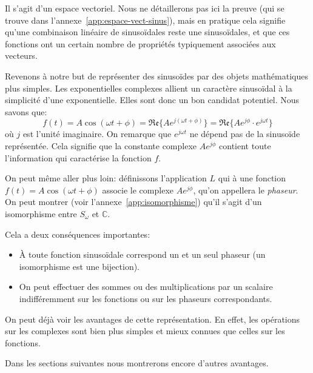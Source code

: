 Il s'agit d'un espace vectoriel.
Nous ne détaillerons pas ici la preuve
(qui se trouve dans l'annexe~\ref{app:espace-vect-sinus}),
mais en pratique cela signifie qu'une combinaison linéaire
de sinusoïdales reste une sinusoïdales,
et que ces fonctions ont un certain nombre de propriétés
typiquement associées aux vecteurs.

Revenons à notre but de représenter des sinusoïdes
par des objets mathématiques plus simples.
Les exponentielles complexes allient un caractère sinusoïdal à
la simplicité d'une exponentielle.
Elles sont donc un bon candidat potentiel.
Nous savons que:
\[
    f(t) = A\cos(\omega t + \phi) = \mathfrak{Re}\{Ae^{j(\omega t + \phi)}\}
    = \mathfrak{Re}\{Ae^{j\phi}\cdot e^{j\omega t}\}
\]
où $j$ est l'unité imaginaire.
On remarque que $e^{j\omega t}$ ne dépend pas de la sinusoïde représentée.
Cela signifie que la constante complexe $Ae^{j\phi}$ contient
toute l'information qui caractérise la fonction $f$.

On peut même aller plus loin: définissons l'application $L$
qui à une fonction $f(t) = A\cos(\omega t + \phi)$
associe le complexe $Ae^{j\phi}$,
qu'on appellera le \emph{phaseur}.
On peut montrer (voir l'annexe~\ref{app:isomorphisme}) qu'il s'agit d'un
isomorphisme entre $S_\omega$ et $\mathbb{C}$.

Cela a deux conséquences importantes:
\begin{itemize}
    \item À toute fonction sinusoïdale correspond un et un seul phaseur
        (un isomorphisme est une bijection).
    \item On peut effectuer des sommes ou des multiplications par un scalaire
        indifféremment sur les fonctions ou sur les phaseurs correspondants.
\end{itemize}

On peut déjà voir les avantages de cette représentation.
En effet,
les opérations sur les complexes sont bien plus simples et mieux connues
que celles sur les fonctions.

Dans les sections suivantes nous montrerons
encore d'autres avantages.
